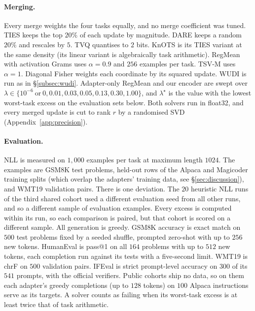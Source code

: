 \paragraph{Merging.} Every merge weights the four tasks equally, and no merge
coefficient was tuned. TIES keeps the top $20\%$ of each update by magnitude.
DARE keeps a random $20\%$ and rescales by $5$. TVQ quantises to $2$ bits.
KnOTS is its TIES variant at the same density (its linear variant is
algebraically task arithmetic). RegMean with activation Grams uses
$\alpha = 0.9$ and $256$ examples per task. TSV-M uses $\alpha = 1$. Diagonal
Fisher weights each coordinate by its squared update. WUDI is run as in
\S\ref{subsec:wudi}. Adapter-only RegMean and our encoder are swept over
$\lambda \in \{10^{-6}\ \text{or}\ 0, 0.01, 0.03, 0.05, 0.13, 0.30, 1.00\}$,
and $\lambda^\star$ is the value with the lowest worst-task excess on the
evaluation sets below. Both solvers run in float32, and every merged update is
cut to rank $r$ by a randomised SVD (Appendix~\ref{app:precision}).

\paragraph{Evaluation.} NLL is measured on $1{,}000$ examples per task at
maximum length $1024$. The examples are GSM8K test problems, held-out rows of
the Alpaca and Magicoder training splits (which overlap the adapters' training
data, see \S\ref{sec:discussion}), and WMT19 validation pairs. There is one
deviation. The $20$ heuristic NLL runs of the third shared cohort used a
different evaluation seed from all other runs, and so a different sample of
evaluation examples. Every excess is computed within its run, so each
comparison is paired, but that cohort is scored on a different sample. All
generation is greedy. GSM8K accuracy is exact match on $500$ test problems
fixed by a seeded shuffle, prompted zero-shot with up to $256$ new tokens.
HumanEval is pass@1 on all $164$ problems with up to $512$ new tokens, each
completion run against its tests with a five-second limit. WMT19 is chrF on
$500$ validation pairs. IFEval is strict prompt-level accuracy on $300$ of its
$541$ prompts, with the official verifiers. Public cohorts ship no data, so on
them each adapter's greedy completions (up to $128$ tokens) on $100$ Alpaca
instructions serve as its targets. A solver counts as failing when its
worst-task excess is at least twice that of task arithmetic.
